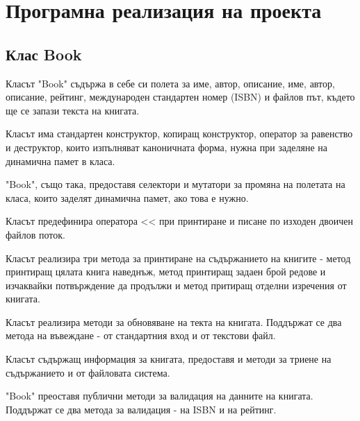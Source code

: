 \section{Програмна реализация на проекта}
\subsection{Клас Book}
Класът "Book" съдържа в себе си полета за име, автор, описание, име, автор, описание, рейтинг, международен стандартен номер (ISBN) и файлов път, където ще се запази текста на книгата.



Класът има стандартен конструктор, копиращ конструктор, оператор за равенство и деструктор, които изпълняват каноничната форма, нужна при заделяне на динамична памет в класа.



"Book", също така, предоставя селектори и мутатори за промяна на полетата на класа, които заделят динамична памет, ако това е нужно.



Класът предефинира оператора << при принтиране и писане по изходен двоичен файлов поток.



Класът реализира три метода за принтиране на съдържанието на книгите - метод принтиращ цялата книга наведнъж, метод принтиращ задаен брой редове и изчаквайки потвърждение да продължи и метод притиращ отделни изречения от книгата.



Класът реализира методи за обновяване на текта на книгата. Поддържат се два метода на въвеждане - от стандартния вход и от текстови файл.



Класът съдържащ информация за книгата, предоставя и методи за триене на съдържанието и от файловата система.



"Book" преоставя публични методи за валидация на данните на книгата. Поддържат се два метода за валидация - на ISBN и на рейтинг.




